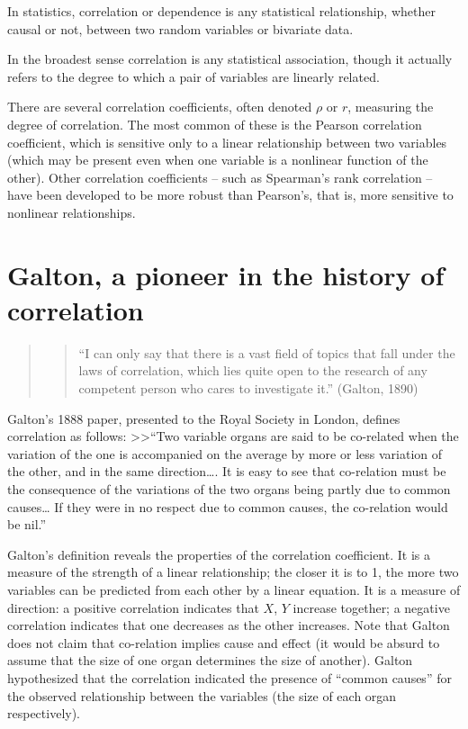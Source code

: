 \documentclass[
]{report}
\begin{document}
In statistics, correlation or dependence is any statistical relationship, whether causal or not, between two random variables or bivariate data.

In the broadest sense correlation is any statistical association, though it actually refers to the degree to which a pair of variables are linearly related.

There are several correlation coefficients, often denoted \(\rho\) or \(r\), measuring the degree of correlation. The most common of these is the Pearson correlation coefficient, which is sensitive only to a linear relationship between two variables (which may be present even when one variable is a nonlinear function of the other). Other correlation coefficients -- such as Spearman's rank correlation -- have been developed to be more robust than Pearson's, that is, more sensitive to nonlinear relationships.

\hypertarget{galton-a-pioneer-in-the-history-of-correlation}{%
\section{Galton, a pioneer in the history of correlation}\label{galton-a-pioneer-in-the-history-of-correlation}}

\begin{quote}
\begin{quote}
``I can only say that there is a vast field of topics that fall under the laws of correlation, which lies quite open to the research of any competent person who cares to investigate it.'' (Galton, 1890)
\end{quote}
\end{quote}

Galton's 1888 paper, presented to the Royal Society in London, defines correlation as follows:
\textgreater\textgreater{}``Two variable organs are said to be co-related when the variation of the one is accompanied on the average by more or less variation of the other, and in the same direction\ldots. It is easy to see that co-relation must be the consequence of the variations of the two organs being partly due to common causes\ldots{} If they were in no respect due to common causes, the co-relation would be nil.''

Galton's definition reveals the properties of the correlation coefficient. It is a measure of the strength of a linear relationship; the closer it is to 1, the more two variables can be predicted from each other by a linear equation. It is a measure of direction: a positive correlation indicates that \(X\), \(Y\) increase together; a negative correlation indicates that one decreases as the other increases. Note that Galton does not claim that co-relation implies cause and effect (it would be absurd to assume that the size of one organ determines the size of another). Galton hypothesized that the correlation indicated the presence of ``common causes'' for the observed relationship between the variables (the size of each organ respectively).
\end{document}
